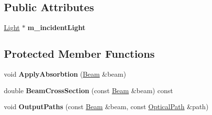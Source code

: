 \subsection*{Public Attributes}
\begin{DoxyCompactItemize}
\item 
\mbox{\label{class_handler_adf74e141c689233565ecc08c7f63b3e8}} 
\mbox{\hyperlink{class_light}{Light}} $\ast$ {\bfseries m\+\_\+incident\+Light}
\end{DoxyCompactItemize}
\subsection*{Protected Member Functions}
\begin{DoxyCompactItemize}
\item 
\mbox{\label{class_handler_affc9ffb72eb7ea751f5efa484d7f4ca6}} 
void {\bfseries Apply\+Absorbtion} (\mbox{\hyperlink{class_beam}{Beam}} \&beam)
\item 
\mbox{\label{class_handler_a9216f95781001eb7e73ee16244344e4e}} 
double {\bfseries Beam\+Cross\+Section} (const \mbox{\hyperlink{class_beam}{Beam}} \&beam) const
\item 
\mbox{\label{class_handler_a1a26cbf9ad33fea2bbd790a188388283}} 
void {\bfseries Output\+Paths} (const \mbox{\hyperlink{class_beam}{Beam}} \&beam, const \mbox{\hyperlink{struct_optical_path}{Optical\+Path}} \&path)
\end{DoxyCompactItemize}
